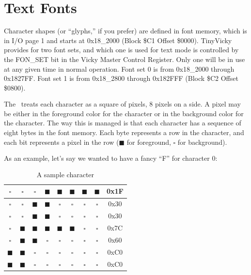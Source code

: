 \section*{Text Fonts}
\label{sec:text_font}

Character shapes (or ``glyphs,'' if you prefer) are defined in font memory, which is in I/O page 1 and starts at 0x18\_2000 (Block \$C1 Offset \$0000). TinyVicky provides for two font sets, and which one is used for text mode is controlled by the FON\_SET bit in the Vicky Master Control Register. Only one will be in use at any given time in normal operation. Font set 0 is from 0x18\_2000 through 0x1827FF. Font set 1 is from 0x18\_2800 through 0x182FFF (Block \$C2 Offset \$0800).

The \jr\ treats each character as a square of pixels, 8 pixels on a side. A pixel may be either in the foreground color for the character or in the background color for the character. The way this is managed is that each character has a sequence of eight bytes in the font memory. Each byte represents a row in the character, and each bit represents a pixel in the row ($\blacksquare$ for foreground, $\square$ for background).

As an example, let's say we wanted to have a fancy ``F'' for character 0:

\begin{table}[ht]
    \begin{center}
        \begin{tabular}{|c|c|c|c|c|c|c|c|c|} \hline
            $\square$ & $\square$ & $\square$ & $\blacksquare$ & $\blacksquare$ & $\blacksquare$ & $\blacksquare$ & $\blacksquare$ & 0x1F \\ \hline
            $\square$ & $\square$ & $\blacksquare$ & $\blacksquare$ & $\square$ & $\square$ & $\square$ & $\square$ & 0x30 \\ \hline
            $\square$ & $\square$ & $\blacksquare$ & $\blacksquare$ & $\square$ & $\square$ & $\square$ & $\square$ & 0x30 \\ \hline
            $\square$ & $\blacksquare$ & $\blacksquare$ & $\blacksquare$ & $\blacksquare$ & $\blacksquare$ & $\square$ & $\square$ & 0x7C \\ \hline
            $\square$ & $\blacksquare$ & $\blacksquare$ & $\square$ & $\square$ & $\square$ & $\square$ & $\square$ & 0x60 \\ \hline
            $\blacksquare$ & $\blacksquare$ & $\square$ & $\square$ & $\square$ & $\square$ & $\square$ & $\square$ & 0xC0 \\ \hline
            $\blacksquare$ & $\blacksquare$ & $\square$ & $\square$ & $\square$ & $\square$ & $\square$ & $\square$ & 0xC0 \\ \hline
        \end{tabular}
    \end{center}
    \caption{A sample character}
    \label{tab:text_font}
\end{table}

